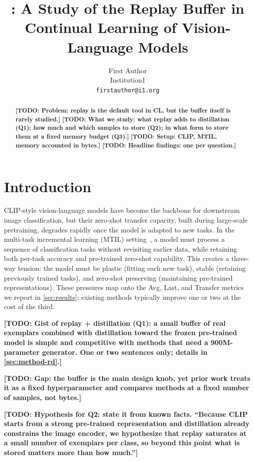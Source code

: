 \documentclass[10pt,twocolumn,letterpaper]{article}
\title{\TODO{Title}: A Study of the Replay Buffer in Continual Learning of Vision-Language Models}
\author{First Author\\
Institution1\\
{\tt\small firstauthor@i1.org}
}
\newcommand{\TODO}[1]{\textbf{\color{red}[TODO: #1]}}
\newcommand{\Q}[1]{\textbf{Q#1}\xspace}     %
\begin{document}
\maketitle

\begin{abstract}
\TODO{Problem: replay is the default tool in CL, but the buffer itself is rarely studied.}
\TODO{What we study: what replay adds to distillation (\Q{1}); how much and which samples to store (\Q{2}); in what form to store them at a fixed memory budget (\Q{3}).}
\TODO{Setup: CLIP, MTIL, memory accounted in bytes.}
\TODO{Headline findings: one per question.}
\end{abstract}

\section{Introduction}
\label{sec:intro}

CLIP-style vision-language models have become the backbone for downstream image classification, but their zero-shot transfer capacity, built during large-scale pretraining, degrades rapidly once the model is adapted to new tasks. In the multi-task incremental learning (MTIL) setting~\cite{zheng2023zscl}, a model must process a sequence of classification tasks without revisiting earlier data, while retaining both per-task accuracy and pre-trained zero-shot capability. This creates a three-way tension: the model must be plastic (fitting each new task), stable (retaining previously trained tasks), and zero-shot preserving (maintaining pre-trained representations). These pressures map onto the Avg, Last, and Transfer metrics we report in \cref{sec:results}; existing methods typically improve one or two at the cost of the third.

\TODO{Gist of replay + distillation (\Q{1}): a small buffer of real exemplars combined with distillation toward the frozen pre-trained model is simple and competitive with methods that need a 900M-parameter generator. One or two sentences only; details in \cref{sec:method-rd}.}

\TODO{Gap: the buffer is the main design knob, yet prior work treats it as a fixed hyperparameter and compares methods at a fixed number of samples, not bytes.}

\TODO{Hypothesis for \Q{2}: state it from known facts. \eg ``Because CLIP starts from a strong pre-trained representation and distillation already constrains the image encoder, we hypothesize that replay saturates at a small number of exemplars per class, so beyond this point what is stored matters more than how much.''}
\end{document}
